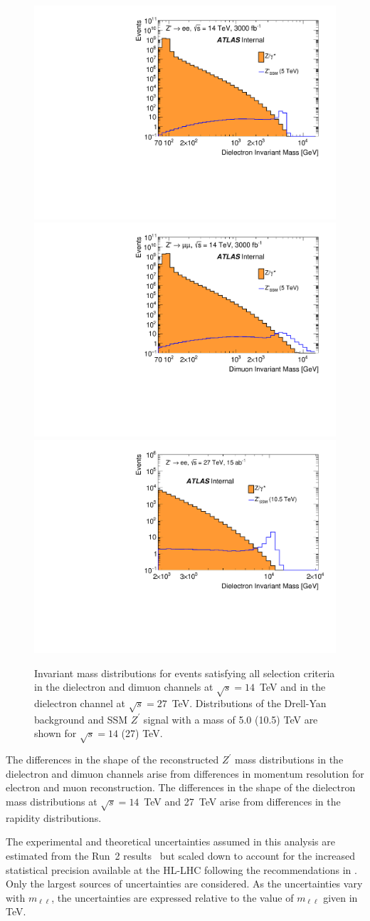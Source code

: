 \begin{figure}[tbp]
\centering
\includegraphics[width=0.325\columnwidth]{./section7OtherSignatures/img/Zee_Mll_5000M_smear.pdf}
\includegraphics[width=0.325\columnwidth]{./section7OtherSignatures/img/Zmumu_Mll_5000M_smear.pdf}
\includegraphics[width=0.325\columnwidth]{./section7OtherSignatures/img/Zee_Mll_10500M_smear.pdf}
  \caption{
    Invariant mass distributions for events satisfying all selection criteria in the dielectron and dimuon channels at $\sqrt{s}=14$~TeV and in the dielectron channel at $\sqrt{s}=27$~TeV.
    Distributions of the Drell-Yan background and SSM $Z^\prime$ signal with a mass of 5.0 (10.5) TeV
    are shown for $\sqrt{s} = 14$ (27) TeV.
}
\label{fig:ATLAS_Zprimell_mll}
\end{figure}
%
The differences in the shape of the reconstructed $Z^\prime$ mass distributions in the dielectron and dimuon
channels arise from differences in momentum resolution for electron and muon reconstruction.
The differences in the shape of the dielectron mass distributions at $\sqrt{s}=14$~TeV and 27~TeV
arise from differences in the rapidity distributions.

The experimental and theoretical uncertainties assumed in this analysis are estimated from the
Run~2 results~\cite{Aaboud:2017buh} but scaled down to account for the increased statistical
precision available at the HL-LHC following the recommendations in .
Only the largest sources of uncertainties are considered. As the uncertainties vary
with $m_{\ell\ell}$, the uncertainties are expressed relative to the value of $m_{\ell\ell}$ given in TeV.

